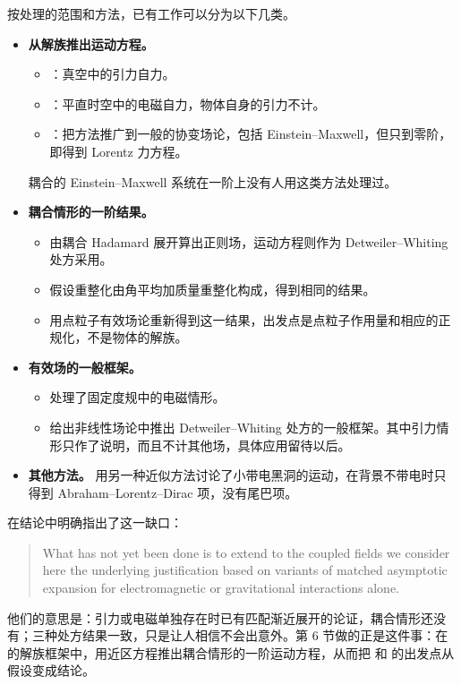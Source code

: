 \documentclass[11pt,a4paper]{ctexart}
\numberwithin{equation}{section}
\begin{document}
按处理的范围和方法，已有工作可以分为以下几类。
\begin{itemize}
\item \textbf{从解族推出运动方程。}
  \begin{itemize}
  \item \citet{GrallaWald2008}：真空中的引力自力。
  \item \citet{GrallaHarteWald2009}：平直时空中的电磁自力，物体自身的引力不计。
  \item \citet{Gralla2010,Gralla2013}：把方法推广到一般的协变场论，包括 Einstein--Maxwell，但只到零阶，即得到 Lorentz 力方程。
  \end{itemize}
  耦合的 Einstein--Maxwell 系统在一阶上没有人用这类方法处理过。
\item \textbf{耦合情形的一阶结果。}
  \begin{itemize}
  \item \citet{ZimmermanPoisson2014} 由耦合 Hadamard 展开算出正则场，运动方程则作为 Detweiler--Whiting 处方采用。
  \item \citet{LinzFriedmanWiseman2014b} 假设重整化由角平均加质量重整化构成，得到相同的结果。
  \item \citet{Zimmerman2015} 用点粒子有效场论重新得到这一结果，出发点是点粒子作用量和相应的正规化，不是物体的解族。
  \end{itemize}
\item \textbf{有效场的一般框架。}
  \begin{itemize}
  \item \citet{Harte2009} 处理了固定度规中的电磁情形。
  \item \citet{HarteBlancoFlanagan2025} 给出非线性场论中推出 Detweiler--Whiting 处方的一般框架。其中引力情形只作了说明，而且不计其他场，具体应用留待以后。
  \end{itemize}
\item \textbf{其他方法。}\citet{FutamaseHoganItoh2008} 用另一种近似方法讨论了小带电黑洞的运动，在背景不带电时只得到 Abraham--Lorentz--Dirac 项，没有尾巴项。
\end{itemize}

\citet{LinzFriedmanWiseman2014b} 在结论中明确指出了这一缺口：
\begin{quote}\small
What has not yet been done is to extend to the coupled fields we consider here the underlying justification based on variants of matched asymptotic expansion for electromagnetic or gravitational interactions alone.
\end{quote}
他们的意思是：引力或电磁单独存在时已有匹配渐近展开的论证，耦合情形还没有；三种处方结果一致，只是让人相信不会出意外。第 6 节做的正是这件事：在 \citet{GrallaWald2008} 的解族框架中，用近区方程推出耦合情形的一阶运动方程，从而把 \citet{ZimmermanPoisson2014} 和 \citet{LinzFriedmanWiseman2014b} 的出发点从假设变成结论。
\end{document}
